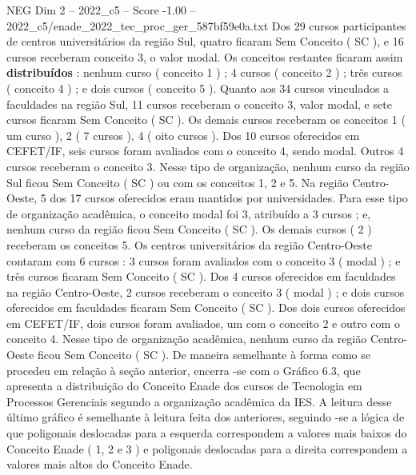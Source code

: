 \begin{textsample}{NEG Dim 2 – 2022\_c5 – Score -1.00 – 2022\_c5/enade\_2022\_tec\_proc\_ger\_587bf59e0a.txt}
Dos 29 cursos participantes de centros universitários da região Sul, quatro ficaram Sem Conceito ( SC ), e 16 cursos receberam conceito 3, o valor modal.
Os conceitos restantes ficaram assim \textbf{distribuídos} : nenhum curso ( conceito 1 ) ; 4 cursos ( conceito 2 ) ; três cursos ( conceito 4 ) ; e dois cursos ( conceito 5 ).
Quanto aos 34 cursos vinculados a faculdades na região Sul, 11 cursos receberam o conceito 3, valor modal, e sete cursos ficaram Sem Conceito ( SC ).
Os demais cursos receberam os conceitos 1 ( um curso ), 2 ( 7 cursos ), 4 ( oito cursos ).
Dos 10 cursos oferecidos em CEFET/IF, seis cursos foram avaliados com o conceito 4, sendo modal.
Outros 4 cursos receberam o conceito 3.
Nesse tipo de organização, nenhum curso da região Sul ficou Sem Conceito ( SC ) ou com os conceitos 1, 2 e 5.
Na região Centro-Oeste, 5 dos 17 cursos oferecidos eram mantidos por universidades.
Para esse tipo de organização acadêmica, o conceito modal foi 3, atribuído a 3 cursos ; e, nenhum curso da região ficou Sem Conceito ( SC ).
Os demais cursos ( 2 ) receberam os conceitos 5.
Os centros universitários da região Centro-Oeste contaram com 6 cursos : 3 cursos foram avaliados com o conceito 3 ( modal ) ; e três cursos ficaram Sem Conceito ( SC ).
Dos 4 cursos oferecidos em faculdades na região Centro-Oeste, 2 cursos receberam o conceito 3 ( modal ) ; e dois cursos oferecidos em faculdades ficaram Sem Conceito ( SC ).
Dos dois cursos oferecidos em CEFET/IF, dois cursos foram avaliados, um com o conceito 2 e outro com o conceito 4.
Nesse tipo de organização acadêmica, nenhum curso da região Centro-Oeste ficou Sem Conceito ( SC ).
De maneira semelhante à forma como se procedeu em relação à seção anterior, encerra -se com o Gráfico 6.3, que apresenta a distribuição do Conceito Enade dos cursos de Tecnologia em Processos Gerenciais segundo a organização acadêmica da IES.
A leitura desse último gráfico é semelhante à leitura feita dos anteriores, seguindo -se a lógica de que poligonais deslocadas para a esquerda correspondem a valores mais baixos do Conceito Enade ( 1, 2 e 3 ) e poligonais deslocadas para a direita correspondem a valores mais altos do Conceito Enade.

\end{textsample}
